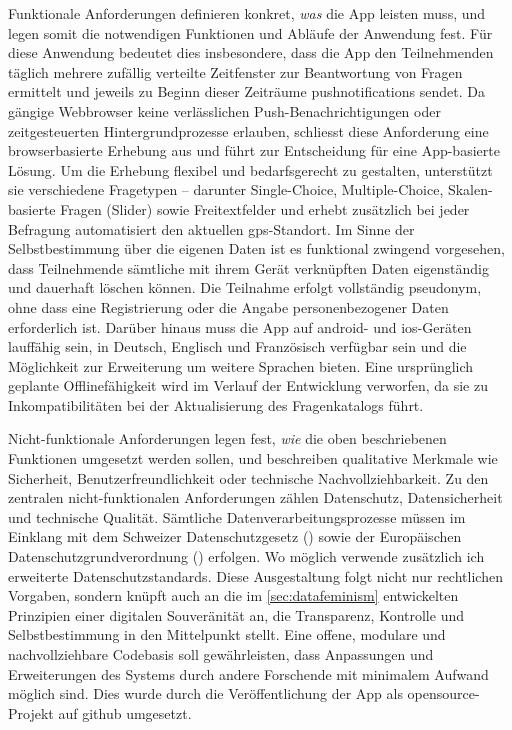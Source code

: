 Funktionale Anforderungen definieren konkret, \textit{was} die App leisten muss, und legen somit die notwendigen Funktionen und Abläufe der Anwendung fest. Für diese Anwendung bedeutet dies insbesondere, dass die App den Teilnehmenden täglich mehrere zufällig verteilte Zeitfenster zur Beantwortung von Fragen ermittelt und jeweils zu Beginn dieser Zeiträume \glspl{pushnotification} sendet. Da gängige Webbrowser keine verlässlichen Push-Benachrichtigungen oder zeitgesteuerten Hintergrundprozesse erlauben, schliesst diese Anforderung eine browserbasierte Erhebung aus und führt zur Entscheidung für eine App-basierte Lösung. Um die Erhebung flexibel und bedarfsgerecht zu gestalten, unterstützt sie verschiedene Fragetypen -- darunter Single-Choice, Multiple-Choice, Skalen-basierte Fragen (Slider) sowie Freitextfelder und erhebt zusätzlich bei jeder Befragung automatisiert den aktuellen \gls{gps}-Standort. Im Sinne der Selbstbestimmung über die eigenen Daten ist es funktional zwingend vorgesehen, dass Teilnehmende sämtliche mit ihrem Gerät verknüpften Daten eigenständig und dauerhaft löschen können. Die Teilnahme erfolgt vollständig pseudonym, ohne dass eine Registrierung oder die Angabe personenbezogener Daten erforderlich ist. Darüber hinaus muss die App auf \gls{android}- und \gls{ios}-Geräten lauffähig sein, in Deutsch, Englisch und Französisch verfügbar sein und die Möglichkeit zur Erweiterung um weitere Sprachen bieten. Eine ursprünglich geplante Offlinefähigkeit wird im Verlauf der Entwicklung verworfen, da sie zu Inkompatibilitäten bei der Aktualisierung des Fragenkatalogs führt.

Nicht-funktionale Anforderungen legen fest, \textit{wie} die oben beschriebenen Funktionen umgesetzt werden sollen, und beschreiben qualitative Merkmale wie Sicherheit, Benutzerfreundlichkeit oder technische Nachvollziehbarkeit. Zu den zentralen nicht-funktionalen Anforderungen zählen Datenschutz, Datensicherheit und technische Qualität. Sämtliche Datenverarbeitungsprozesse müssen im Einklang mit dem Schweizer Datenschutzgesetz () sowie der Europäischen Datenschutzgrundverordnung () erfolgen. Wo möglich verwende zusätzlich ich erweiterte Datenschutzstandards. Diese Ausgestaltung folgt nicht nur rechtlichen Vorgaben, sondern knüpft auch an die im \cref{sec:datafeminism} entwickelten Prinzipien einer digitalen Souveränität an, die Transparenz, Kontrolle und Selbstbestimmung in den Mittelpunkt stellt. Eine offene, modulare und nachvollziehbare Codebasis soll gewährleisten, dass Anpassungen und Erweiterungen des Systems durch andere Forschende mit minimalem Aufwand möglich sind. Dies wurde durch die Veröffentlichung der App als \gls{opensource}-Projekt auf \gls{github} umgesetzt.

